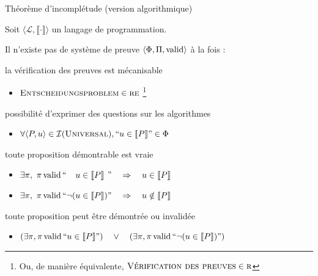 
\begingroup


\begin{frame}{Théorème d'incomplétude (version algorithmique)}

  Soit $\langle \mathcal{L}, \llbracket \cdot \rrbracket \rangle$ un langage de programmation.
  
    Il n'existe pas de système de preuve $\langle \Phi, \Pi, \operatorname{valid} \rangle$ à la fois : 
    \begin{description}
    \item[Formel :] la vérification des preuves est mécanisable
      \begin{itemize}
      \item $\textsc{Entscheidungsproblem} \in \textsc{re}$
        \footnote{Ou, de manière équivalente, $\textsc{Vérification des preuves} \in \textsc{r}$}
      \end{itemize}
    \item[Turing expressif :] possibilité d'exprimer des questions sur les algorithmes
      \begin{itemize}
      \item $\forall \langle P, u \rangle \in \mathcal{I}(\textsc{Universal}), ``u \in \llbracket P \rrbracket" \in \Phi$
      \end{itemize}
    \item[Correct :] toute proposition démontrable est vraie
      \begin{itemize}
      \item $\exists \pi,~ \pi \operatorname{valid} ``\phantom{\lnot(} u \in \llbracket P \rrbracket\phantom{)}" \quad\Rightarrow\quad u \in \llbracket P \rrbracket$
      \item $\exists \pi,~ \pi \operatorname{valid} ``         \lnot(  u \in \llbracket P \rrbracket         ) " \quad\Rightarrow\quad u \notin \llbracket P \rrbracket$
      \end{itemize}
    \item[Complet :] toute proposition peut être démontrée ou invalidée
      \begin{itemize}
      \item $(\exists \pi, \pi \operatorname{valid} ``u \in \llbracket P \rrbracket") \quad \lor\quad (\exists \pi, \pi \operatorname{valid} ``\lnot(u \in \llbracket P \rrbracket)")$
      \end{itemize}
    \end{description}


\end{frame}
